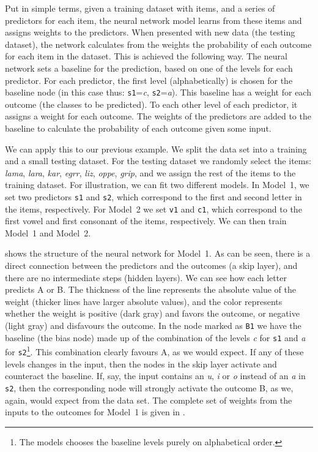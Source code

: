 Put in simple terms, given a training dataset with items, and a series of predictors for each item, the neural network model learns from these items and assigns weights to the predictors. When presented with new data (the testing dataset), the network calculates from the weights the probability of each outcome for each item in the dataset. This is achieved the following way. The neural network sets a baseline for the prediction, based on one of the levels for each predictor. For each predictor, the first level (alphabetically) is chosen for the baseline node (in this case thus: \texttt{s1}=\textit{c}, \texttt{s2}=\textit{a}). This baseline has a weight for each outcome (the classes to be predicted). To each other level of each predictor, it assigns a weight for each outcome. The weights of the predictors are added to the baseline to calculate the probability of each outcome given some input.

We can apply this to our previous example. We split the data set into a training and a small testing dataset. For the testing dataset we randomly select the items: \textit{lama}, \textit{lara}, \textit{kar}, \textit{egrr}, \textit{liz}, \textit{oppe}, \textit{grip}, and we assign the rest of the items to the training dataset. For illustration, we can fit two different models. In Model~1, we set two predictors \texttt{s1} and \texttt{s2}, which correspond to the first and second letter in the items, respectively. For Model~2 we set \texttt{v1} and \texttt{c1}, which correspond to the first vowel and first consonant of the items, respectively. We can then train Model~1 and Model~2.

 shows the structure of the neural network for Model~1. As can be seen, there is a direct connection between the predictors and the outcomes (a skip layer), and there are no intermediate steps (hidden layers). We can see how each letter predicts A or B. The thickness of the line represents the absolute value of the weight (thicker lines have larger absolute values), and the color represents whether the weight is positive (dark gray) and favors the outcome, or negative (light gray) and disfavours the outcome. In the node marked as \texttt{B1} we have the baseline (the bias node) made up of the combination of the levels \textit{c} for \texttt{s1} and \textit{a} for \texttt{s2}\footnote{The models chooses the baseline levels purely on alphabetical order.}. This combination clearly favours A, as we would expect. If any of these levels changes in the input, then the nodes in the skip layer activate and counteract the baseline. If, say, the input contains an \textit{u}, \textit{i} or \textit{o} instead of an \textit{a} in \texttt{s2}, then the corresponding node will strongly activate the outcome B, as we, again, would expect from the data set. The complete set of weights from the inputs to the outcomes for Model~1 is given in .

